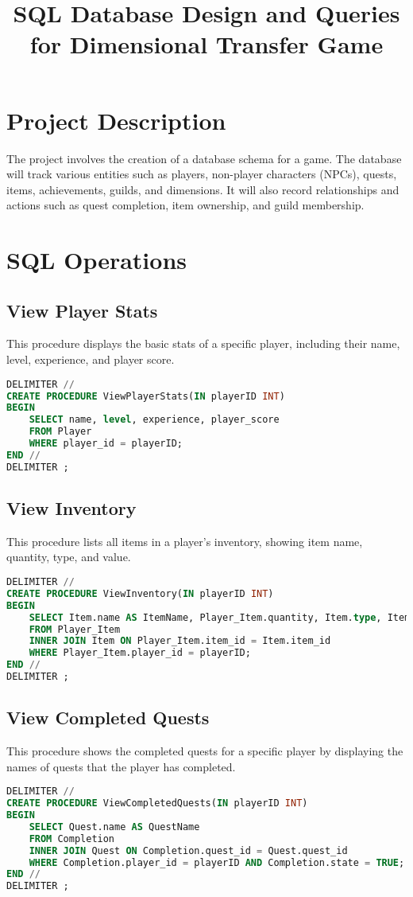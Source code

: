 \documentclass{article}
\title{SQL Database Design and Queries for Dimensional Transfer Game}
\author{}
\begin{document}
\maketitle

\section{Project Description}
The project involves the creation of a database schema for a game. The database will track various entities such as players, non-player characters (NPCs), quests, items, achievements, guilds, and dimensions. It will also record relationships and actions such as quest completion, item ownership, and guild membership.

\section{SQL Operations}

\subsection{View Player Stats}
This procedure displays the basic stats of a specific player, including their name, level, experience, and player score.
\begin{lstlisting}[language=sql,caption=View Player Stats]
DELIMITER //
CREATE PROCEDURE ViewPlayerStats(IN playerID INT)
BEGIN
    SELECT name, level, experience, player_score
    FROM Player
    WHERE player_id = playerID;
END //
DELIMITER ;
\end{lstlisting}

\subsection{View Inventory}
This procedure lists all items in a player's inventory, showing item name, quantity, type, and value.
\begin{lstlisting}[language=sql,caption=View Inventory]
DELIMITER //
CREATE PROCEDURE ViewInventory(IN playerID INT)
BEGIN
    SELECT Item.name AS ItemName, Player_Item.quantity, Item.type, Item.value
    FROM Player_Item
    INNER JOIN Item ON Player_Item.item_id = Item.item_id
    WHERE Player_Item.player_id = playerID;
END //
DELIMITER ;
\end{lstlisting}

\subsection{View Completed Quests}
This procedure shows the completed quests for a specific player by displaying the names of quests that the player has completed.
\begin{lstlisting}[language=sql,caption=View Completed Quests]
DELIMITER //
CREATE PROCEDURE ViewCompletedQuests(IN playerID INT)
BEGIN
    SELECT Quest.name AS QuestName
    FROM Completion
    INNER JOIN Quest ON Completion.quest_id = Quest.quest_id
    WHERE Completion.player_id = playerID AND Completion.state = TRUE;
END //
DELIMITER ;
\end{lstlisting}
\end{document}
